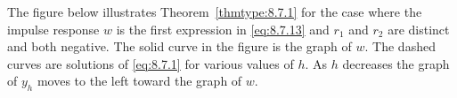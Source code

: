 \documentclass{ximera}
\begin{document}
The figure below %
illustrates Theorem~\ref{thmtype:8.7.1} for the
case where the impulse response $w$ is the first expression in
\eqref{eq:8.7.13} and $r_1$ and $r_2$ are distinct and both negative. The
solid curve in the figure is the graph of $w$. The dashed curves are
solutions of \eqref{eq:8.7.1} for various values of $h$. As $h$ decreases
the graph of $y_h$ moves to the left toward the graph of $w$.

\begin{center}  
\end{center}



\end{document}
